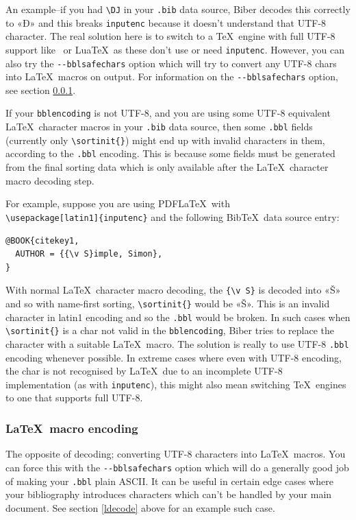 \documentclass{ltxdockit}
\begin{document}
An example--if you had \verb+\DJ+ in your \verb+.bib+ data source,
Biber decodes this correctly to «Đ» and this breaks \verb+inputenc+
because it doesn't understand that UTF-8 character. The real solution here
is to switch to a \TeX\ engine with full UTF-8 support like \XeTeX\ or Lua\TeX\
as these don't use or need \verb+inputenc+. However, you can also try the
\verb+--bblsafechars+ option which will try to convert any UTF-8 chars into
\LaTeX\ macros on output. For information on the \verb+--bblsafechars+
option, see section \ref{lencode}.
\bigskip
{}

If your \verb+bblencoding+ is not UTF-8, and you are using some UTF-8
equivalent \LaTeX\ character macros in your \verb+.bib+ data source, then some
\verb+.bbl+ fields (currently only \verb+\sortinit{}+) might end up
with invalid characters in them, according to the \verb+.bbl+
encoding. This is because some fields must be generated from the final
sorting data which is only available after the \LaTeX\ character macro
decoding step.

For example, suppose you are using PDF\LaTeX\ with\\
\verb+\usepackage[latin1]{inputenc}+ and the following Bib\TeX\
data source entry:

\begin{verbatim}
@BOOK{citekey1,
  AUTHOR = {{\v S}imple, Simon},
}
\end{verbatim}

\noindent With normal \LaTeX\ character macro decoding, the
\verb+{\v S}+ is decoded into «Š» and so with name-first sorting,
\verb+\sortinit{}+ would be «Š». This is an invalid character in
latin1 encoding and so the \verb+.bbl+ would be broken. In such cases
when \verb+\sortinit{}+ is a char not valid in the \verb+bblencoding+,
Biber tries to replace the character with a suitable \LaTeX\
macro. The solution is really to use UTF-8 \verb+.bbl+ encoding whenever
possible. In extreme cases where even with UTF-8 encoding,
the char is not recognised by \LaTeX\ due to an incomplete UTF-8
implementation (as with \verb+inputenc+), this might also mean
switching \TeX\ engines to one that supports full UTF-8.

\subsubsection{\LaTeX\ macro encoding}\label{lencode}

The opposite of decoding; converting UTF-8 characters into \LaTeX\ macros.
You can force this with the \verb+--bblsafechars+ option which will do a
generally good job of making your \verb+.bbl+ plain ASCII. It can be useful
in certain edge cases where your bibliography introduces characters which
can't be handled by your main document. See section \ref{ldecode} above for
an example such case.
\end{document}
